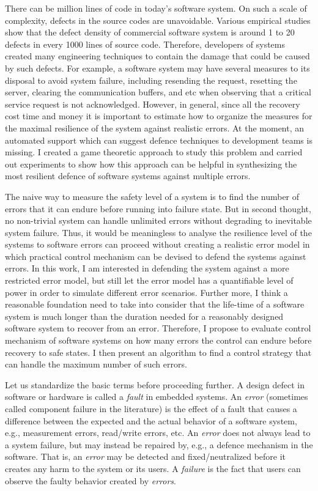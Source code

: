 There can be million lines of code in today's software system.
On such a scale of complexity, defects in the source codes are unavoidable.  
Various empirical studies show that the defect density of commercial software system is around 1 to 20 defects in every 1000 lines of source code\cite{Sommerville:2006:SE:1196763}.
Therefore, developers of systems created many engineering techniques to contain the damage that could be caused by such defects.
For example, a software system may have several measures to its disposal to avoid system failure, including resending the request, resetting the server, clearing the communication buffers, and etc when observing that a critical service request is not acknowledged.
However, in general, since all the recovery cost time and money it is important to estimate how to organize the measures for the maximal resilience of the system against realistic errors.
At the moment, an automated support which can suggest defence techniques to development teams is missing.
I created a game theoretic approach to study this problem and carried out experiments to show how this approach can be helpful in  synthesizing the most resilient defence of software systems against multiple errors.

The naive way to measure the safety level of a system is to find the number of errors that it can endure before running into failure state.
But in second thought, no non-trivial system can handle unlimited errors without degrading to inevitable system failure.
Thus, it would be meaningless to analyse the resilience level of the systems to software errors can proceed without creating a realistic error model in which practical control mechanism can be devised to defend the systems against errors.
In this work, I am interested in defending the system against a more restricted error model, but still let the error model has a quantifiable level of power in order to simulate different error scenarios.
Further more, I think a reasonable foundation need to take into consider that the life-time of a software system is much longer than the duration needed for a reasonably designed software system to recover from an error.
Therefore, I propose to evaluate control mechanism of software systems on how many errors the control can endure before recovery to safe states.
I then present an algorithm to find a control strategy that can handle the maximum number of such errors.

Let us standardize the basic terms before proceeding further.
A design defect in software or hardware is called a {\it fault} in embedded systems.
An {\it error} (sometimes called component failure in the literature) is the effect of a fault that causes a difference between the expected and the actual behavior of a software system, e.g., measurement errors, read/write errors, etc. 
An {\it error} does not always lead to a system failure, but may instead be repaired by, e.g., a defence mechanism in the software. 
That is, an {\it error} may be detected and fixed/neutralized before it creates any harm to the system or its users.
A {\it failure} is the fact that users can observe the faulty behavior created by {\it errors}.

